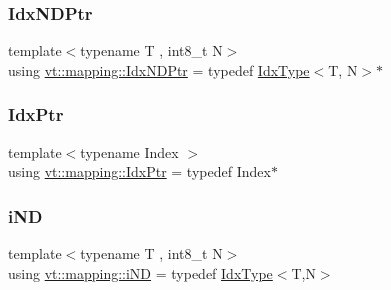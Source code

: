 \mbox{\label{namespacevt_1_1mapping_ab77f5302cd346d499e48a8c796043746}} 
\subsubsection{\texorpdfstring{Idx\+N\+D\+Ptr}{IdxNDPtr}}
{\footnotesize\ttfamily template$<$typename T , int8\+\_\+t N$>$ \\
using \hyperlink{namespacevt_1_1mapping_ab77f5302cd346d499e48a8c796043746}{vt\+::mapping\+::\+Idx\+N\+D\+Ptr} = typedef \hyperlink{namespacevt_a906c25b521ff516f5e8ba6d96fe2d424}{Idx\+Type}$<$T, N$>$$\ast$}

\mbox{\label{namespacevt_1_1mapping_a1bcab0d331bff853fe09c964d5e9cc8c}} 
\subsubsection{\texorpdfstring{Idx\+Ptr}{IdxPtr}}
{\footnotesize\ttfamily template$<$typename Index $>$ \\
using \hyperlink{namespacevt_1_1mapping_a1bcab0d331bff853fe09c964d5e9cc8c}{vt\+::mapping\+::\+Idx\+Ptr} = typedef Index$\ast$}

\mbox{\label{namespacevt_1_1mapping_ad53b53dc14e67437c17cefe9c3c70380}} 
\subsubsection{\texorpdfstring{i\+ND}{iND}}
{\footnotesize\ttfamily template$<$typename T , int8\+\_\+t N$>$ \\
using \hyperlink{namespacevt_1_1mapping_ad53b53dc14e67437c17cefe9c3c70380}{vt\+::mapping\+::i\+ND} = typedef \hyperlink{namespacevt_a906c25b521ff516f5e8ba6d96fe2d424}{Idx\+Type}$<$T,N$>$}

\mbox{\label{namespacevt_1_1mapping_a41b113c28bb6430fbcb5be66e08ccf9f}} 
